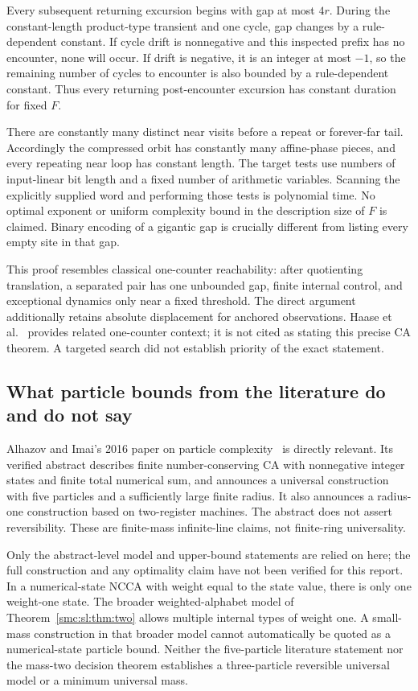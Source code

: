 \documentclass[11pt,letterpaper]{article}
\numberwithin{equation}{section}
\theoremstyle{definition}
\theoremstyle{remark}
\begin{document}
Every subsequent returning excursion begins with gap at most $4r$. During the constant-length product-type transient and one cycle, gap changes by a rule-dependent constant. If cycle drift is nonnegative and this inspected prefix has no encounter, none will occur. If drift is negative, it is an integer at most $-1$, so the remaining number of cycles to encounter is also bounded by a rule-dependent constant. Thus every returning post-encounter excursion has constant duration for fixed $F$.

There are constantly many distinct near visits before a repeat or forever-far tail. Accordingly the compressed orbit has constantly many affine-phase pieces, and every repeating near loop has constant length. The target tests use numbers of input-linear bit length and a fixed number of arithmetic variables. Scanning the explicitly supplied word and performing those tests is polynomial time. No optimal exponent or uniform complexity bound in the description size of $F$ is claimed. Binary encoding of a gigantic gap is crucially different from listing every empty site in that gap.

This proof resembles classical one-counter reachability: after quotienting translation, a separated pair has one unbounded gap, finite internal control, and exceptional dynamics only near a fixed threshold. The direct argument additionally retains absolute displacement for anchored observations. Haase et al.~\cite{onecounter} provides related one-counter context; it is not cited as stating this precise CA theorem. A targeted search did not establish priority of the exact statement.

\subsection{What particle bounds from the literature do and do not say}
Alhazov and Imai's 2016 paper on particle complexity~\cite{alhazovimai} is directly relevant. Its verified abstract describes finite number-conserving CA with nonnegative integer states and finite total numerical sum, and announces a universal construction with five particles and a sufficiently large finite radius. It also announces a radius-one construction based on two-register machines. The abstract does not assert reversibility. These are finite-mass infinite-line claims, not finite-ring universality.

Only the abstract-level model and upper-bound statements are relied on here; the full construction and any optimality claim have not been verified for this report. In a numerical-state NCCA with weight equal to the state value, there is only one weight-one state. The broader weighted-alphabet model of Theorem~\ref{smc:sl:thm:two} allows multiple internal types of weight one. A small-mass construction in that broader model cannot automatically be quoted as a numerical-state particle bound. Neither the five-particle literature statement nor the mass-two decision theorem establishes a three-particle reversible universal model or a minimum universal mass.
\end{document}
